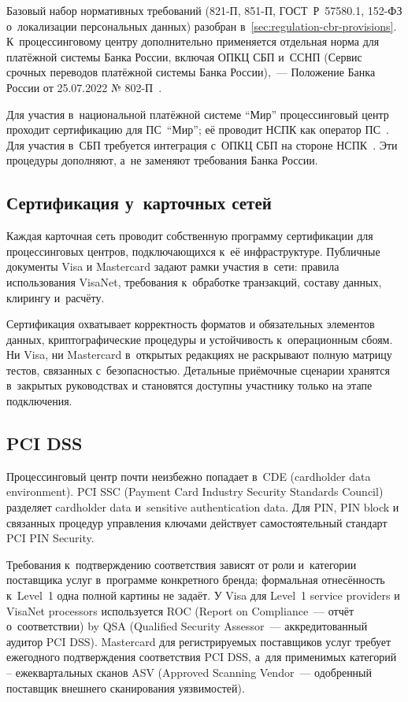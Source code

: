 Базовый набор нормативных требований (821-П, 851-П, ГОСТ~Р~57580.1, 152-ФЗ
о~локализации персональных данных) разобран
в~\autoref{sec:regulation-cbr-provisions}. К~процессинговому центру
дополнительно применяется отдельная норма для платёжной системы
Банка России, включая ОПКЦ СБП и~ССНП (Сервис срочных переводов платёжной системы Банка России),~--- Положение Банка России
от 25.07.2022 № 802-П~\cite{cbr-802p}.

Для участия в~национальной платёжной системе \enquote{Мир}
процессинговый центр проходит сертификацию
для ПС~\enquote{Мир}; её проводит НСПК как оператор
ПС~\cite{nspk-mir-rules}. Для участия в~СБП требуется
интеграция с~ОПКЦ СБП на стороне
НСПК~\cite{cbr-sbp-rules}. Эти процедуры дополняют, а~не
заменяют требования Банка России.

\subsection*{Сертификация у~карточных сетей}

Каждая карточная сеть проводит собственную программу
сертификации для процессинговых центров, подключающихся
к~её инфраструктуре. Публичные документы Visa и Mastercard
задают рамки участия в~сети: правила использования VisaNet,
требования к~обработке транзакций, составу данных, клирингу
и~расчёту.~\cite{visa-core-rules,mc-rules,mc-tpr}

Сертификация охватывает корректность форматов и обязательных
элементов данных, криптографические процедуры и устойчивость
к~операционным сбоям. Ни Visa, ни Mastercard в~открытых
редакциях не раскрывают полную матрицу тестов, связанных
с~безопасностью. Детальные приёмочные сценарии хранятся
в~закрытых руководствах и становятся доступны участнику только
на этапе подключения.~\cite{visa-core-rules,mc-rules}

\subsection*{PCI DSS}

Процессинговый центр почти неизбежно попадает в~CDE
(cardholder data environment). PCI SSC (Payment Card Industry Security Standards Council) разделяет
cardholder data и~sensitive authentication data. Для PIN,
PIN block и связанных процедур управления ключами действует
самостоятельный стандарт PCI PIN
Security.~\cite{pci-scoping-guidance,pci-faq-1335,pci-pin-security}

Требования к~подтверждению соответствия зависят
от роли и~категории поставщика услуг в~программе конкретного
бренда; формальная отнесённость к~Level~1 одна полной картины не задаёт. У Visa для Level~1 service providers и VisaNet
processors используется ROC (Report on Compliance~--- отчёт о~соответствии) by QSA (Qualified Security Assessor~--- аккредитованный аудитор PCI DSS). Mastercard для
регистрируемых поставщиков услуг требует ежегодного
подтверждения соответствия PCI DSS, а~для применимых
категорий -- ежеквартальных
сканов ASV (Approved Scanning Vendor~--- одобренный поставщик внешнего сканирования уязвимостей).~\cite{visa-pci-validation-best-practice,mc-service-provider-categories-pci,pci-faq-1234-asv}
